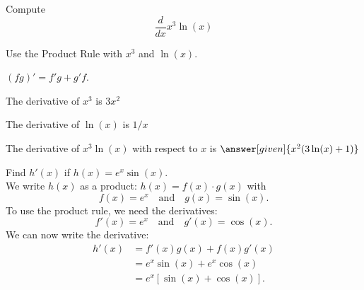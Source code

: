 \documentclass{ximera}
\begin{document}
\begin{center}
\begin{foldable}
\end{foldable}
\end{center}



\begin{problem} %
  Compute
  \[
  \frac{d}{dx} x^3\ln(x)
  \]
  
    \begin{hint}
      Use the Product Rule with $x^3$ and $\ln(x)$.
    \end{hint}
    \begin{hint}
      $(fg)' = f'g+g'f$.
    \end{hint}
    \begin{hint}
      The derivative of $x^3$ is $3x^2$
    \end{hint}
    \begin{hint}
      The derivative of $\ln(x)$ is $1/x$
    \end{hint}
		The derivative of $x^3\ln(x)$ with respect to $x$ is
		 $\answer[given]{x^2(3 \ln(x) + 1)}$
		
\end{problem}


\begin{example} %
Find $h'(x)$ if $h(x) = e^x\sin(x)$.\\
We write $h(x)$ as a product: $h(x) = f(x)\cdot g(x)$ with
\[f(x) = e^x \quad \text{and} \quad g(x) = \sin(x).\]
To use the product rule, we need the derivatives:
\[f'(x) = e^x \quad \text{and} \quad g'(x) = \cos(x).\]
We can now write the derivative:
\begin{align*}
h'(x) &= f'(x)g(x) + f(x)g'(x) \\
&= e^x \sin(x) + e^x \cos(x) \\
&= e^x[\sin(x) +  \cos(x)].
\end{align*}
\end{example}


\begin{center}
\begin{foldable}
\end{foldable}
\end{center}
\end{document}
